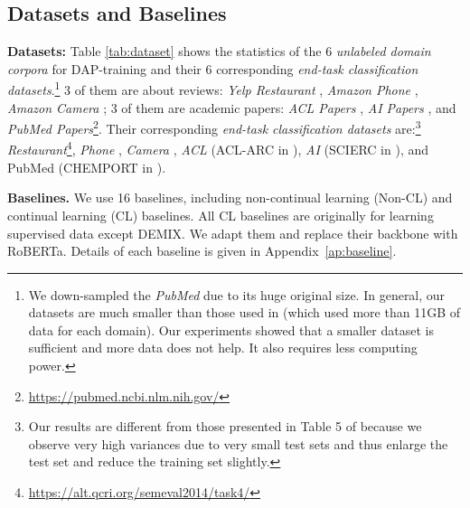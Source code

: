 \documentclass{article} \usepackage{iclr2023_conference,times}
\begin{document}
\vspace{-1mm}
\subsection{Datasets and Baselines}
\label{sec:data-baselines}
\vspace{-1mm}
\textbf{Datasets:} 
Table \ref{tab:dataset} shows the statistics of the 6 \textit{unlabeled domain corpora} for DAP-training and their 6 corresponding \textit{end-task classification datasets}.\footnote{We down-sampled the \textit{PubMed} due to its huge original size. In general, our datasets are much smaller than those used in  \citep{DBLP:conf/acl/GururanganMSLBD20} (which used more than 11GB of data for each domain). Our experiments showed that a smaller dataset is sufficient and more data does not help. It also requires less computing power.} 3 of them are about reviews: \textit{Yelp Restaurant} \citep{DBLP:conf/naacl/XuLSY19}, \textit{Amazon Phone} \citep{DBLP:conf/emnlp/NiLM19}, \textit{Amazon Camera} \citep{DBLP:conf/emnlp/NiLM19}; 3 of them are academic papers: \textit{ACL Papers} \citep{DBLP:conf/acl/LoWNKW20}, \textit{AI Papers} \citep{DBLP:conf/acl/LoWNKW20}, and \textit{PubMed Papers}\footnote{\url{https://pubmed.ncbi.nlm.nih.gov/}}.
Their corresponding \textit{end-task classification datasets} are:\footnote{Our results are different from those presented in Table 5 of \citep{DBLP:conf/acl/GururanganMSLBD20} because we observe very high variances due to very small test sets and thus enlarge the test set and reduce the training set slightly.} \textit{Restaurant}\footnote{\url{https://alt.qcri.org/semeval2014/task4/}}, \textit{Phone} \citep{ding2008holistic,hu2004mining}, \textit{Camera} \citep{ding2008holistic,hu2004mining}, 
\textit{ACL} (ACL-ARC in \citep{DBLP:journals/tacl/JurgensKHMJ18}), \textit{AI} (SCIERC in \citep{DBLP:conf/emnlp/LuanHOH18}), and PubMed (CHEMPORT in \citep{kringelum2016chemprot}).  



\noindent
\textbf{Baselines.} We use 16 baselines, including non-continual learning (Non-CL) and continual learning (CL) baselines. {\color{black}All CL baselines are originally for learning supervised data except DEMIX.} We adapt them and replace their backbone with RoBERTa. Details of each baseline is given in Appendix~\ref{ap:baseline}. 
\end{document}
